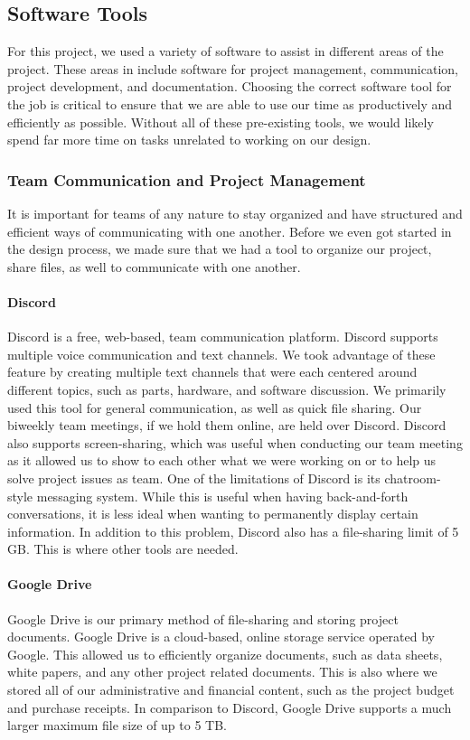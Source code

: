 \subsection{Software Tools}
For this project, we used a variety of software to assist in different areas of the project. These areas in include software for project management, communication, project development, and documentation. Choosing the correct software tool for the job is critical to ensure that we are able to use our time as productively and efficiently as possible. Without all of these pre-existing tools, we would likely spend far more time on tasks unrelated to working on our design.

\subsubsection{Team Communication and Project Management}
It is important for teams of any nature to stay organized and have structured and efficient ways of communicating with one another. Before we even got started in the design process, we made sure that we had a tool to organize our project, share files, as well to communicate with one another.

\paragraph{Discord}
Discord is a free, web-based, team communication platform. Discord supports multiple voice communication and text channels. We took advantage of these feature by creating multiple text channels that were each centered around different topics, such as parts, hardware, and software discussion. We primarily used this tool for general communication, as well as quick file sharing. Our biweekly team meetings, if we hold them online, are held over Discord. Discord also supports screen-sharing, which was useful when conducting our team meeting as it allowed us to show to each other what we were working on or to help us solve project issues as team. One of the limitations of Discord is its chatroom-style messaging system. While this is useful when having back-and-forth conversations, it is less ideal when wanting to permanently display certain information. In addition to this problem, Discord also has a file-sharing limit of 5 GB. This is where other tools are needed.

\paragraph{Google Drive}
Google Drive is our primary method of file-sharing and storing project documents. Google Drive is a cloud-based, online storage service operated by Google. This allowed us to efficiently organize documents, such as data sheets, white papers, and any other project related documents. This is also where we stored all of our administrative and financial content, such as the project budget and purchase receipts. In comparison to Discord, Google Drive supports a much larger maximum file size of up to 5 TB.

